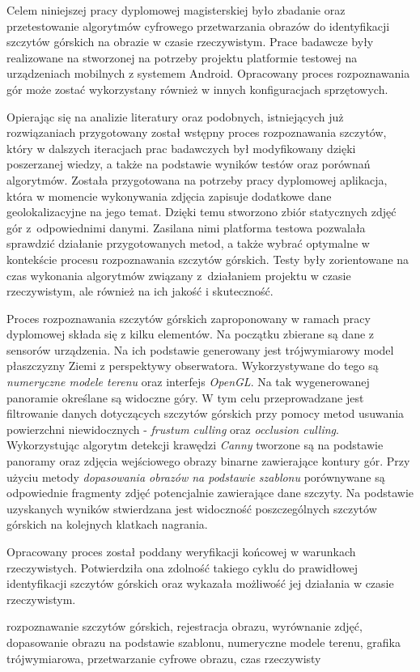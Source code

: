 \cleardoublepage %
\streszczenie

Celem niniejszej pracy dyplomowej magisterskiej było zbadanie oraz przetestowanie algorytmów cyfrowego przetwarzania obrazów do identyfikacji szczytów górskich na obrazie w czasie rzeczywistym. Prace badawcze były realizowane na stworzonej na potrzeby projektu platformie testowej na urządzeniach mobilnych z systemem Android. Opracowany proces rozpoznawania gór może  zostać wykorzystany również w innych konfiguracjach sprzętowych.

Opierając się na analizie literatury oraz podobnych, istniejących już rozwiązaniach przygotowany został wstępny proces rozpoznawania szczytów, który w dalszych iteracjach prac badawczych był modyfikowany dzięki poszerzanej wiedzy, a także na podstawie wyników testów oraz porównań algorytmów. Została przygotowana na potrzeby pracy dyplomowej aplikacja, która w momencie wykonywania zdjęcia zapisuje dodatkowe dane geolokalizacyjne na jego temat. Dzięki temu stworzono zbiór statycznych zdjęć gór z~odpowiednimi danymi. Zasilana nimi platforma testowa pozwalała sprawdzić działanie przygotowanych metod, a także wybrać optymalne w kontekście procesu rozpoznawania szczytów górskich. Testy były zorientowane na czas wykonania algorytmów związany z~działaniem projektu w czasie rzeczywistym, ale również na ich jakość i skuteczność.

Proces rozpoznawania szczytów górskich zaproponowany w ramach pracy dyplomowej składa się z kilku elementów. Na początku zbierane są dane z sensorów urządzenia. Na ich podstawie generowany jest trójwymiarowy model płaszczyzny Ziemi z perspektywy obserwatora. Wykorzystywane do tego są \textit{numeryczne modele terenu} oraz interfejs \textit{OpenGL}. Na tak wygenerowanej panoramie określane są widoczne góry. W tym celu przeprowadzane jest filtrowanie danych dotyczących szczytów górskich przy pomocy metod usuwania powierzchni niewidocznych - \textit{frustum culling} oraz \textit{occlusion culling}. Wykorzystując algorytm detekcji krawędzi \textit{Canny} tworzone są na podstawie panoramy oraz zdjęcia wejściowego obrazy binarne zawierające kontury gór. Przy użyciu metody \textit{dopasowania obrazów na podstawie szablonu} porównywane są odpowiednie fragmenty zdjęć potencjalnie zawierające dane szczyty. Na podstawie uzyskanych wyników stwierdzana jest widoczność poszczególnych szczytów górskich na kolejnych klatkach nagrania. 

Opracowany proces został poddany weryfikacji końcowej w warunkach rzeczywistych. Potwierdziła ona zdolność takiego cyklu do prawidłowej identyfikacji szczytów górskich oraz wykazała możliwość jej działania w czasie rzeczywistym.




\slowakluczowe rozpoznawanie szczytów górskich, rejestracja obrazu, wyrównanie zdjęć, dopasowanie obrazu na podstawie szablonu, numeryczne modele terenu, grafika trójwymiarowa, przetwarzanie cyfrowe obrazu, czas rzeczywisty